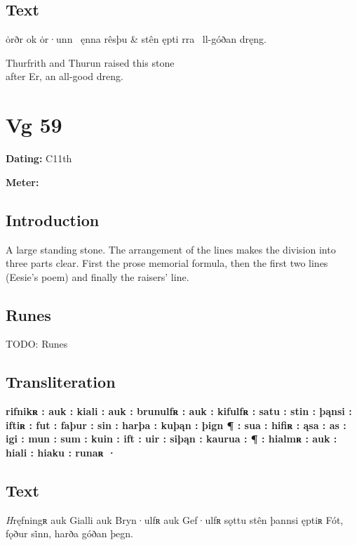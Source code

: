 \subsection{Text}

\bvg\bva[]%
ȯrðr ok ȯr·unn \hld\ ęnna rêsþu &
stên ępti rra \hld\ ll-góðan dręng.\eva

\bvb Thurfrith and Thurun raised this stone \\
after Er, an all-good dreng.\evb\evg

\sectionline\clearpage


\section{Vg 59}

\begin{flushright}%
\textbf{Dating:} C11th

\textbf{Meter:} \Fornyrdislag
\end{flushright}%

\subsection{Introduction}

A large standing stone.  The arrangement of the lines makes the division into three parts clear.  First the prose memorial formula, then the first two lines (Eesie’s poem) and finally the raisers’ line.

\subsection{Runes}

TODO: Runes%

\subsection{Transliteration}

\textbf{rifnikʀ : auk : kiali : auk : brunulfʀ : auk : kifulfʀ : satu : stin : þąnsi : iftiʀ : fut : faþur : sin : harþa : kuþąn : þign ¶
: sua : hifiʀ : ąsa : as : igi : mun : sum : kuin : ift : uir : siþąn : kaurua : ¶
: hialmʀ : auk : hiali : hiaku : runaʀ ·}

\subsection{Text}

\bpg\bpa[0]%
\startsub \emph{H}ręfningʀ auk Gialli auk Bryn·ulfʀ auk Gef·ulfʀ sǫttu stên þannsi ęptiʀ Fót, fǫður si̇nn, harða góðan þegn.\endsub\epa

